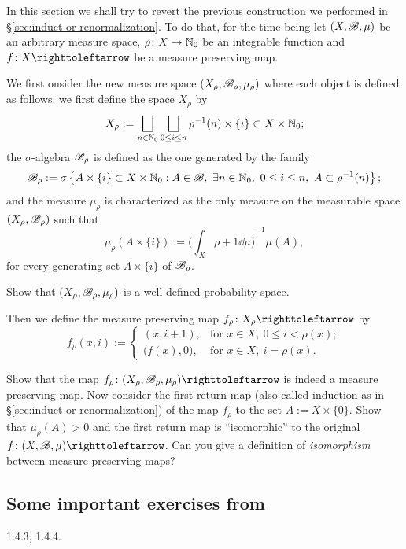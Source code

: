 In this section we shall try to revert the previous construction we performed in \S\ref{sec:induct-or-renormalization}. To do that, for the time being let $(X,\mathscr{B},\mu)$ be an arbitrary measure space, $\rho\colon X\to\mathbb{N}_{0}$ be an integrable function and $f\colon X\carr$ be a measure preserving map.

We first onsider the new measure space $(X_{\rho},\mathscr{B}_{\rho},\mu_{\rho})$ where each object is defined as follows: we first define the space $X_{\rho}$ by
\begin{displaymath}
  X_{\rho}:=\bigsqcup_{n\in\mathbb{N}_{0}} \bigsqcup_{0\leq i\leq n} \rho^{-1}(n)\times\{i\} \subset X\times\mathbb{N}_{0};
\end{displaymath}
the $\sigma$-algebra $\mathscr{B}_{\rho}$ is defined as the one generated by the family
\begin{displaymath}
  \B_{\rho}:=\sigma\left\{A\times\{i\}\subset X\times\N_{0} : A\in\B,\ \exists n\in\N_{0},\ 0\leq i\leq n,\ A\subset\rho^{-1}(n)\right\};
\end{displaymath}
and the measure $\mu_{\rho}$ is characterized as the only measure on the measurable space $(X_{\rho},\mathscr{B}_{\rho})$ such that
\begin{displaymath}
  \mu_{\rho}(A\times\{i\}):={\bigg(\int_{X}\rho+1\dd\mu\bigg)}^{-1}\mu(A),
\end{displaymath}
for every generating set $A\times\{i\}$ of $\mathscr{B}_{\rho}$.

\begin{exercise}
  Show that $(X_{\rho},\mathscr{B}_{\rho},\mu_{\rho})$ is a well-defined probability space.
\end{exercise}

Then we define the measure preserving map $f_{\rho}\colon X_{\rho}\carr$ by
\begin{displaymath}
  f_{\rho}(x,i):=
  \begin{cases}
    (x,i+1), & \text{for } x\in X,\ 0\leq i<\rho(x); \\
    \big(f(x),0\big), & \text{for } x\in X,\ i=\rho(x).
  \end{cases}
\end{displaymath}


\begin{exercise}
  Show that the map $f_{\rho}\colon (X_{\rho},\B_{\rho},\mu_{\rho})\carr$ is indeed a measure preserving map. Now consider the first return map (also called induction as in \S\ref{sec:induct-or-renormalization}) of the map $f_{\rho}$ to the set $A:=X\times\{0\}$. Show that $\mu_{\rho}(A)>0$ and the first return map is ``isomorphic'' to the original $f\colon (X,\B,\mu)\carr$. Can you give a definition of \emph{isomorphism} between measure preserving maps?
\end{exercise}

\subsection{Some important exercises from~\cite[\S1.4.4]{VianaOliveiraFoundErgTh}}
\label{sec:some-import-exerc-1.4.4}

1.4.3, 1.4.4.
